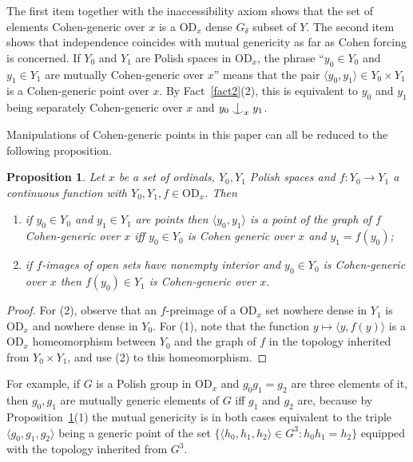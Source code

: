 \documentclass{article}
\newcommand{\gd}{\delta}
\newcommand{\vd}{\mathrm{OD}}
\newcommand{\forkindep}[1][]{%
  \mathrel{
    \mathop{
      \vcenter{
        \hbox{\oalign{\noalign{\kern-.3ex}\hfil$\vert$\hfil\cr
              \noalign{\kern-.7ex}
              $\smile$\cr\noalign{\kern-.3ex}}}
      }
    }\displaylimits_{#1}
  }
}
\newtheorem{proposition}[theorem]{Proposition}
\theoremstyle{definition}
\begin{document}
\noindent The first item together with the inaccessibility axiom shows that the set of elements Cohen-generic over $x$ is a $\vd_x$ dense $G_\gd$ subset of $Y$. The second item shows that independence coincides with mutual genericity as far as Cohen forcing is concerned. If $Y_0$ and $Y_1$ are Polish spaces in $\vd_x$, the phrase ``$y_0\in Y_0$ and $y_1\in Y_1$ are mutually Cohen-generic over $x$'' means that the pair $\langle y_0, y_1\rangle\in Y_0\times Y_1$ is a Cohen-generic point over $x$. By Fact~\ref{fact2}(2), this is equivalent to $y_0$ and $y_1$ being separately Cohen-generic over $x$ and $y_0\forkindep_xy_1$.

Manipulations of Cohen-generic points in this paper can all be reduced to the following proposition.

\begin{proposition}
\label{mutualproposition}
Let $x$ be a set of ordinals, $Y_0, Y_1$ Polish spaces and $f\colon Y_0\to Y_1$ a continuous function with $Y_0, Y_1, f\in\vd_x$. Then

\begin{enumerate}
\item if $y_0\in Y_0$ and $y_1\in Y_1$ are points then $\langle y_0, y_1\rangle$ is a point of the graph of $f$ Cohen-generic over $x$ iff $y_0\in Y_0$ is Cohen generic over $x$ and $y_1=f(y_0)$;
\item if $f$-images of open sets have nonempty interior and $y_0\in Y_0$ is Cohen-generic over $x$ then $f(y_0)\in Y_1$ is Cohen-generic over $x$.
\end{enumerate}
\end{proposition}

\begin{proof}
For (2), observe that an $f$-preimage of a $\vd_x$ set nowhere dense in $Y_1$ is $\vd_x$ and nowhere dense in $Y_0$. For (1), note that the function $y\mapsto \langle y, f(y)\rangle$ is a $\vd_x$ homeomorphism between $Y_0$ and the graph of $f$ in the topology inherited from $Y_0\times Y_1$, and use (2) to this homeomorphism.
\end{proof}

\noindent For example, if $G$ is a Polish group in $\vd_x$ and $g_0g_1=g_2$ are three elements of it, then $g_0, g_1$ are mutually generic elements of $G$ iff $g_1$ and $g_2$ are, because by Proposition~\ref{mutualproposition}(1) the mutual genericity is in both cases equivalent to the triple $\langle g_0, g_1, g_2\rangle$ being a generic point of the set $\{\langle h_0, h_1, h_2\rangle\in G^3\colon h_0h_1=h_2\}$ equipped with the topology inherited from $G^3$.




 

\end{document}
